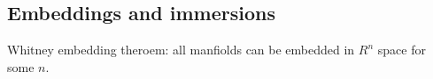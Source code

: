 
\subsection{Embeddings and immersions}
Whitney embedding theroem: all manfiolds can be embedded in \(R^n\) space for some \(n\).

